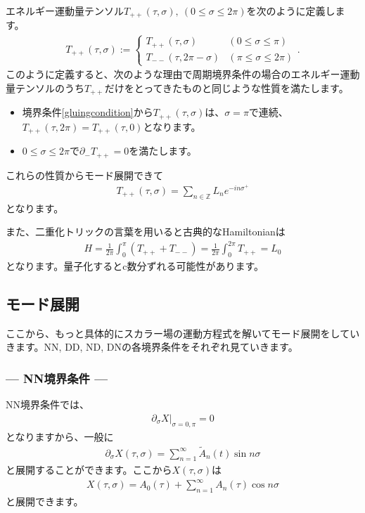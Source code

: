 \documentclass[report,paper=a4, fontsize=12pt, line_length=16cm, number_of_lines=34,dvipdfmx]{jlreq}
\numberwithin{equation}{chapter}
\numberwithin{equation}{section}
\newcommand{\Zb}{\mathbb{Z}}
\newcommand{\del}{\partial}
\newcommand{\At}{\widetilde{A}}
\begin{document}
エネルギー運動量テンソル$T_{++}(\tau,\sigma),\ (0\le \sigma \le 2\pi)$を次のように定義します。
\begin{align}
  T_{++}(\tau,\sigma):=
  \begin{cases}
    T_{++}(\tau,\sigma)& (0\le \sigma \le \pi)\\
    T_{--}(\tau,2\pi-\sigma) & (\pi\le \sigma \le 2\pi)
  \end{cases}.
\end{align}
このように定義すると、次のような理由で周期境界条件の場合のエネルギー運動量テンソルのうち$T_{++}$だけをとってきたものと同じような性質を満たします。
\begin{itemize}
  \item 境界条件\eqref{gluingcondition}から$T_{++}(\tau,\sigma)$は、$\sigma=\pi$で連続、$T_{++}(\tau,2\pi)=T_{++}(\tau,0)$となります。
  \item $0\le \sigma \le 2\pi$で$\del_{-}T_{++}=0$を満たします。
\end{itemize}
これらの性質からモード展開できて
\begin{align}
  T_{++}(\tau,\sigma)=\sum_{n\in\Zb}
  L_{n}e^{-in\sigma^{+}}
\end{align}
となります。

また、二重化トリックの言葉を用いると古典的なHamiltonianは
\begin{align}
  H=\frac{1}{2\pi}\int_{0}^{\pi}(T_{++}+T_{--})
  =\frac{1}{2\pi}\int_{0}^{2\pi}T_{++}
  =L_{0}
\end{align}
となります。量子化するとc数分ずれる可能性があります。

\subsection{モード展開}
ここから、もっと具体的にスカラー場の運動方程式を解いてモード展開をしていきます。NN, DD, ND, DNの各境界条件をそれぞれ見ていきます。
\subsubsection*{--- NN境界条件 ---}
NN境界条件では、
\begin{align}
  \del_{\sigma}X\Bigg|_{\sigma=0,\pi}=0
\end{align}
となりますから、一般に
\begin{align}
  \del_{\sigma}X(\tau,\sigma)=\sum_{n=1}^{\infty}\At_n(t)\sin n\sigma
\end{align}
と展開することができます。ここから$X(\tau,\sigma)$は
\begin{align}
  X(\tau,\sigma)=A_{0}(\tau)+\sum_{n=1}^{\infty}A_{n}(\tau)\cos n\sigma\label{NNmodes0}
\end{align}
と展開できます。
\end{document}
